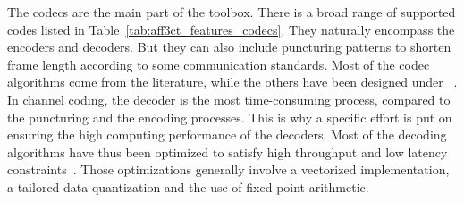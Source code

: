 The codecs are the main part of the toolbox. There is a broad range of supported
codes listed in Table~\ref{tab:aff3ct_features_codecs}. They naturally encompass
the encoders and decoders. But they can also include puncturing patterns to
shorten frame length according to some communication standards. Most of the
codec algorithms come from the literature, while the others have been designed
under \AFFECT~\cite{Tonnellier2016a,Tonnellier2016b,Tonnellier2017,
Leonardon2019}. In channel coding, the decoder is the most time-consuming
process, compared to the puncturing and the encoding processes. This is why a
specific effort is put on ensuring the high computing performance of the
decoders. Most of the decoding algorithms have thus been optimized to satisfy
high throughput and low latency constraints~\cite{LeGal2015a,Cassagne2015c,
Cassagne2016a,Cassagne2016b}. Those optimizations generally involve a vectorized
implementation, a tailored data quantization and the use of fixed-point
arithmetic.

